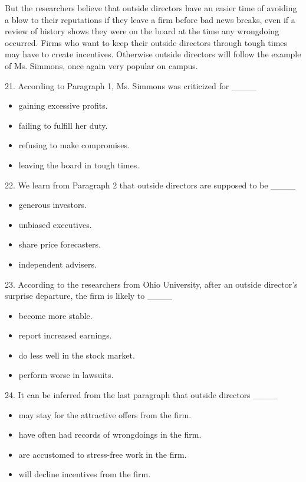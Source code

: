\documentclass[UTF8,11pt]{ctexart}
\begin{document}
But the researchers believe that outside directors have an easier time of avoiding a blow to their reputations if they leave a firm before bad news breaks, even if a review of history shows they were on the board at the time any wrongdoing occurred. Firms who want to keep their outside directors through tough times may have to create incentives. Otherwise outside directors will follow the example of Ms. Simmons, once again very popular on campus.


21. According to Paragraph 1, Ms. Simmons was criticized for \_\_\_\_


\begin{itemize}[leftmargin=2em,itemsep=.2em,topsep=.4em]\item[A.] gaining excessive profits.
\item[B.] failing to fulfill her duty.
\item[C.] refusing to make compromises.
\item[D.] leaving the board in tough times.
\end{itemize}

22. We learn from Paragraph 2 that outside directors are supposed to be \_\_\_\_


\begin{itemize}[leftmargin=2em,itemsep=.2em,topsep=.4em]\item[A.] generous investors.
\item[B.] unbiased executives.
\item[C.] share price forecasters.
\item[D.] independent advisers.
\end{itemize}

23. According to the researchers from Ohio University, after an outside director’s surprise departure, the firm is likely to \_\_\_\_


\begin{itemize}[leftmargin=2em,itemsep=.2em,topsep=.4em]\item[A.] become more stable.
\item[B.] report increased earnings.
\item[C.] do less well in the stock market.
\item[D.] perform worse in lawsuits.
\end{itemize}

24. It can be inferred from the last paragraph that outside directors \_\_\_\_


\begin{itemize}[leftmargin=2em,itemsep=.2em,topsep=.4em]\item[A.] may stay for the attractive offers from the firm.
\item[B.] have often had records of wrongdoings in the firm.
\item[C.] are accustomed to stress-free work in the firm.
\item[D.] will decline incentives from the firm.
\end{itemize}
\end{document}
